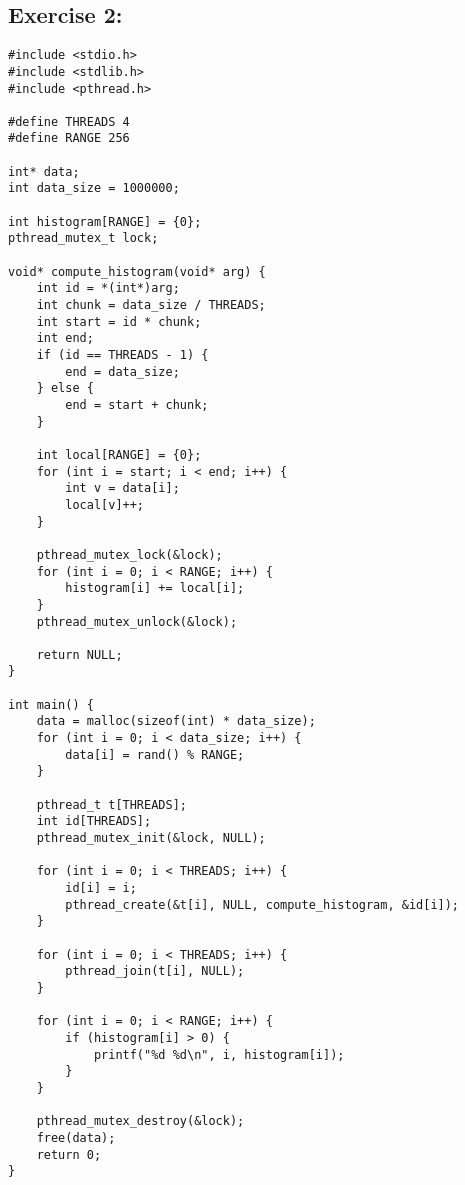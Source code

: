 \documentclass{article}
\begin{document}
\subsection*{Exercise 2:}
\begin{verbatim}
#include <stdio.h>
#include <stdlib.h>
#include <pthread.h>

#define THREADS 4
#define RANGE 256

int* data;
int data_size = 1000000;

int histogram[RANGE] = {0};
pthread_mutex_t lock;

void* compute_histogram(void* arg) {
    int id = *(int*)arg;
    int chunk = data_size / THREADS;
    int start = id * chunk;
    int end;
    if (id == THREADS - 1) {
        end = data_size;
    } else {
        end = start + chunk;
    }

    int local[RANGE] = {0};
    for (int i = start; i < end; i++) {
        int v = data[i];
        local[v]++;
    }

    pthread_mutex_lock(&lock);
    for (int i = 0; i < RANGE; i++) {
        histogram[i] += local[i];
    }
    pthread_mutex_unlock(&lock);

    return NULL;
}

int main() {
    data = malloc(sizeof(int) * data_size);
    for (int i = 0; i < data_size; i++) {
        data[i] = rand() % RANGE;
    }

    pthread_t t[THREADS];
    int id[THREADS];
    pthread_mutex_init(&lock, NULL);

    for (int i = 0; i < THREADS; i++) {
        id[i] = i;
        pthread_create(&t[i], NULL, compute_histogram, &id[i]);
    }

    for (int i = 0; i < THREADS; i++) {
        pthread_join(t[i], NULL);
    }

    for (int i = 0; i < RANGE; i++) {
        if (histogram[i] > 0) {
            printf("%d %d\n", i, histogram[i]);
        }
    }

    pthread_mutex_destroy(&lock);
    free(data);
    return 0;
}
\end{verbatim}
\end{document}
